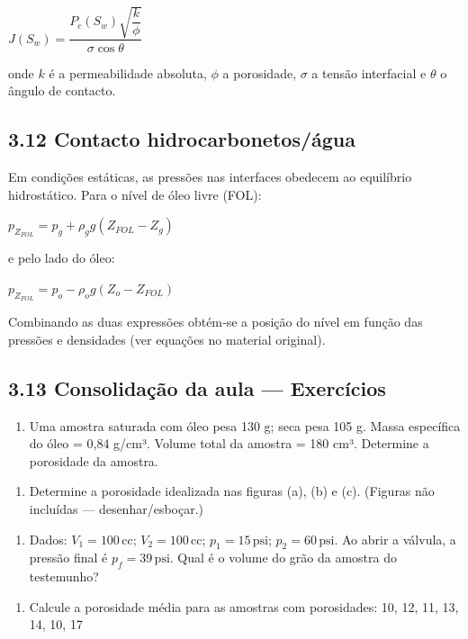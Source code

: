 \documentclass[11pt,a4paper]{article}
\begin{document}
$J(S_w)=\dfrac{P_c(S_w)\sqrt{\dfrac{k}{\phi}}}{\sigma\cos\theta}$

onde $k$ é a permeabilidade absoluta, $\phi$ a porosidade, $\sigma$ a tensão interfacial e $\theta$ o ângulo de contacto.

\subsection{3.12 Contacto hidrocarbonetos/água}
Em condições estáticas, as pressões nas interfaces obedecem ao equilíbrio hidrostático. Para o nível de óleo livre (FOL):

$p_{Z_{FOL}} = p_g + \rho_g g (Z_{FOL}-Z_g)$

e pelo lado do óleo:

$p_{Z_{FOL}} = p_o - \rho_o g (Z_o - Z_{FOL})$

Combinando as duas expressões obtém‑se a posição do nível em função das pressões e densidades (ver equações no material original).

\subsection{3.13 Consolidação da aula — Exercícios}
\begin{enumerate}
\item Uma amostra saturada com óleo pesa 130 g; seca pesa 105 g. Massa específica do óleo = 0,84 g/cm³. Volume total da amostra = 180 cm³. Determine a porosidade da amostra.
\end{enumerate}

\begin{enumerate}
\item Determine a porosidade idealizada nas figuras (a), (b) e (c). (Figuras não incluídas — desenhar/esboçar.)
\end{enumerate}

\begin{enumerate}
\item Dados: $V_1=100\,$cc; $V_2=100\,$cc; $p_1=15{\,}\text{psi}$; $p_2=60{\,}\text{psi}$. Ao abrir a válvula, a pressão final é $p_f=39{\,}\text{psi}$. Qual é o volume do grão da amostra do testemunho?
\end{enumerate}

\begin{enumerate}
\item Calcule a porosidade média para as amostras com porosidades: 10, 12, 11, 13, 14, 10, 17%
\end{enumerate}
\end{document}
